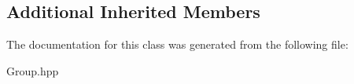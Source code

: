 \subsection*{Additional Inherited Members}


The documentation for this class was generated from the following file\-:\begin{DoxyCompactItemize}
\item 
Group.\-hpp\end{DoxyCompactItemize}
